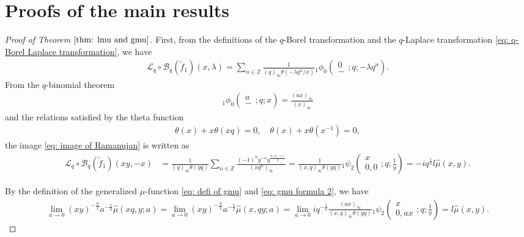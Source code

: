 \documentclass[a4paper]{article}
\newcommand{\Zz}{\mathbb{Z}}
\newcommand{\hyper}[4]{\left( \begin{matrix} #1 \\ #2 \end{matrix};#3;#4\right)}
\numberwithin{equation}{section}
\theoremstyle{plain}
\begin{document}
\section{Proofs of the main results}
\begin{proof}[Proof of Theorem $\ref{thm: lmu and gmu}$]
First, from the definitions of the $q$-Borel transformation and the $q$-Laplace transformation \eqref{eq: q-Borel Laplace transformation}, we have
\begin{align}
\label{eq: image of Ramanujan}
\mathcal{L}_q\circ\mathcal{B}_q\left(\widetilde{f}_1\right)(x,\lambda)=\sum_{n\in\Zz}\frac{1}{(q)_\infty\theta(-\lambda q^n/x)}{}_1\phi_0\hyper{0}{-}{q}{-\lambda q^n}. 
\end{align}
From the $q$-binomial theorem \cite[p.8, (1.3.2)]{GR}
\begin{align*}
{}_1\phi_0\hyper{a}{-}{q}{x}=\frac{(ax)_\infty}{(x)_\infty}
\end{align*}
and the relations satisfied by the theta function
\begin{align}
\label{eq: theta relation}
\theta(x)+x\theta(x q)=0,\quad \theta(x)+x\theta(x^{-1})=0, 
\end{align}
the image \eqref{eq: image of Ramanujan} is written as 
\begin{align*}
\mathcal{L}_q\circ\mathcal{B}_q\left(\widetilde{f}_1\right)(xy,-x)&=\frac{1}{(q)_\infty\theta(y q)}\sum_{n\in\Zz}\frac{(-1)^ny^{-n}q^\frac{n(n-1)}{2}}{(x q^n)_\infty}
  =\frac{1}{(x,q)_\infty\theta(y q)}{}_1\psi_2\hyper{x}{0,0}{q}{\frac{1}{y}}=-iq^\frac{1}{8}l\widehat{\mu}(x,y). 
\end{align*}

By the definition of the generalized $\mu$-function \eqref{eq: defi of gmu} and \eqref{eq: gmu formula 2}, we have 
\begin{align*}
  \lim_{a\to0}(xy)^{-\frac{\alpha }{2}}a^{-\frac{1}{2}}\widehat{\mu}(xq,y;a)
  =
  \lim_{a\to0}(xy)^{-\frac{\alpha }{2}}a^{-\frac{1}{2}}\widehat{\mu}(x,qy;a)
  =
  \lim_{a\to0}iq^{-\frac{1}{8}}\frac{(ax)_\infty}{(x,q)_\infty\theta(y q)}
    {}_1\psi_2\hyper{x}{0,a x}{q}{\frac{1}{y}}=l\widehat{\mu}(x,y). 
\end{align*}

\end{proof}
\end{document}
